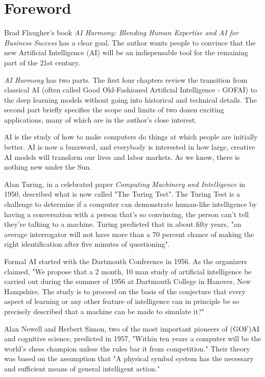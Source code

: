 \let\cleardoublepage\clearpage
\chapter*{Foreword}

Brad Flaugher's book \textit{AI Harmony: Blending Human Expertise and AI for Business Success} has a clear goal. The author wants people to convince that the new Artificial Intelligence (AI) will be an indispensable tool for the remaining part of the 21st century.

\textit{AI Harmony} has two parts. The first four chapters review the transition from classical AI (often called Good Old-Fashioned Artificial Intelligence - GOFAI) to the deep learning models without going into historical and technical details. The second part briefly specifies the scope and limits of two dozen exciting applications, many of which are in the author's close interest.

AI is the study of how to make computers do things at which people are initially better. AI is now a buzzword, and everybody is interested in how large, creative AI models will transform our lives and labor markets. As we know, there is nothing new under the Sun.

Alan Turing, in a celebrated paper \textit{Computing Machinery and Intelligence} in 1950, described what is now called "The Turing Test". The Turing Test is a challenge to determine if a computer can demonstrate human-like intelligence by having a conversation with a person that's so convincing, the person can't tell they're talking to a machine. Turing predicted that in about fifty years, "an average interrogator will not have more than a 70 percent chance of making the right identification after five minutes of questioning".

Formal AI started with the Dartmouth Conference in 1956. As the organizers claimed, "We propose that a 2 month, 10 man study of artificial intelligence be carried out during the summer of 1956 at Dartmouth College in Hanover, New Hampshire. The study is to proceed on the basis of the conjecture that every aspect of learning or any other feature of intelligence can in principle be so precisely described that a machine can be made to simulate it?"

Alan Newell and Herbert Simon, two of the most important pioneers of (GOF)AI and cognitive science, predicted in 1957, "Within ten years a computer will be the world's chess champion unless the rules bar it from competition." Their theory was based on the assumption that "A physical symbol system has the necessary and sufficient means of general intelligent action."

